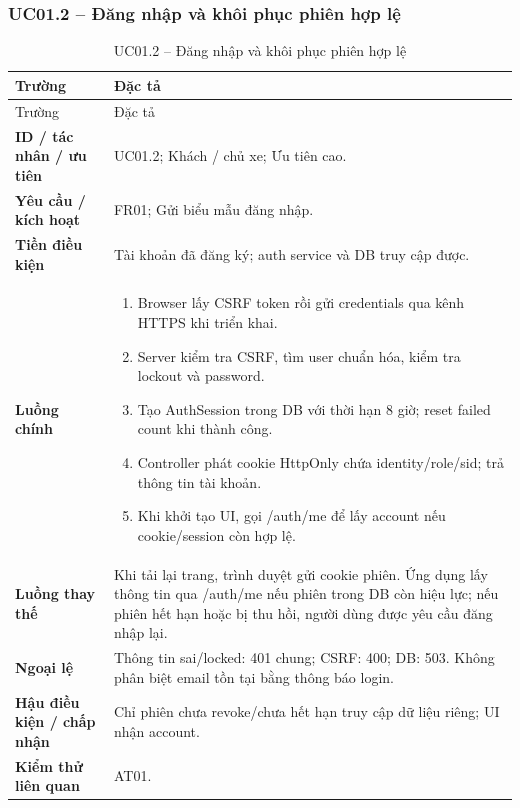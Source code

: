 \subsubsection{UC01.2 -- Đăng nhập và khôi phục phiên hợp lệ}\label{uc:UC01.2}
\begin{smalltable}\begin{longtable}{L{3.2cm}L{11.8cm}}
\caption{UC01.2 -- Đăng nhập và khôi phục phiên hợp lệ}\label{tab:UC01.2}\\
\toprule Trường & Đặc tả\\\midrule\endfirsthead
\toprule Trường & Đặc tả\\\midrule\endhead
\textbf{ID / tác nhân / ưu tiên} & UC01.2; Khách / chủ xe; Ưu tiên cao.\\
\textbf{Yêu cầu / kích hoạt} & FR01; Gửi biểu mẫu đăng nhập.\\
\textbf{Tiền điều kiện} & Tài khoản đã đăng ký; auth service và DB truy cập được.\\
\textbf{Luồng chính} & \begin{enumerate}[leftmargin=*,nosep]
\item Browser lấy CSRF token rồi gửi credentials qua kênh HTTPS khi triển khai.
\item Server kiểm tra CSRF, tìm user chuẩn hóa, kiểm tra lockout và password.
\item Tạo AuthSession trong DB với thời hạn 8 giờ; reset failed count khi thành công.
\item Controller phát cookie HttpOnly chứa identity/role/sid; trả thông tin tài khoản.
\item Khi khởi tạo UI, gọi /auth/me để lấy account nếu cookie/session còn hợp lệ.
\end{enumerate}\\
\textbf{Luồng thay thế} & Khi tải lại trang, trình duyệt gửi cookie phiên. Ứng dụng lấy thông tin qua /auth/me nếu phiên trong DB còn hiệu lực; nếu phiên hết hạn hoặc bị thu hồi, người dùng được yêu cầu đăng nhập lại.\\
\textbf{Ngoại lệ} & Thông tin sai/locked: 401 chung; CSRF: 400; DB: 503. Không phân biệt email tồn tại bằng thông báo login.\\
\textbf{Hậu điều kiện / chấp nhận} & Chỉ phiên chưa revoke/chưa hết hạn truy cập dữ liệu riêng; UI nhận account.\\
\textbf{Kiểm thử liên quan} & AT01.\\
\bottomrule\end{longtable}\end{smalltable}
